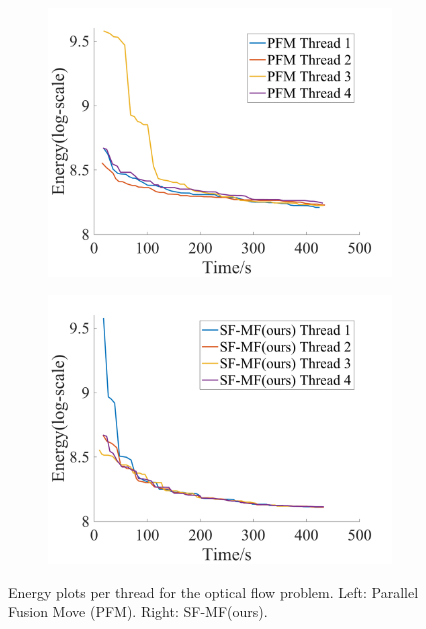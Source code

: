 \begin{figure}[!ht]
  \centering
  \begin{subfigure}[b]{0.49\columnwidth}
    \centering
    \includegraphics[width=\columnwidth]{figure/optical_flow_PFM_threads.png}
  \end{subfigure}  
  \begin{subfigure}[b]{0.49\columnwidth}
    \centering
    \includegraphics[width=\columnwidth]{figure/optical_flow_SF_MF_threads.png}
  \end{subfigure}
  \caption{Energy plots per thread for the optical flow problem. Left: Parallel Fusion  
    Move (PFM). Right: SF-MF(ours).}
  \label{fig:optical_flow_by_threads}  
\end{figure}

